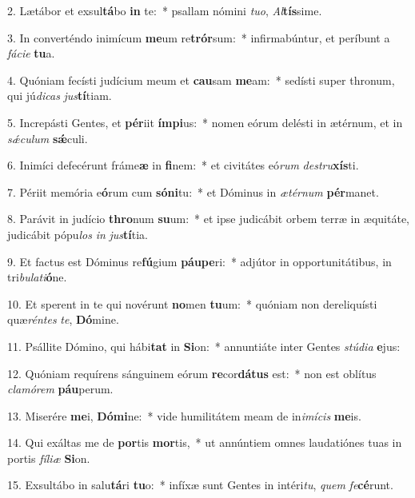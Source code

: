 2. Lætábor et exsul\textbf{tá}bo \textbf{in} te:~*  psallam nómini \textit{tu}\textit{o}, \textit{Al}\textbf{tís}sime.\

3. In converténdo inimícum \textbf{me}um re\textbf{trór}sum:~*  infirmabúntur, et períbunt a \textit{fá}\textit{ci}\textit{e} \textbf{tu}a.\

4. Quóniam fecísti judícium meum et \textbf{cau}sam \textbf{me}am:~*  sedísti super thronum, qui jú\textit{di}\textit{cas} \textit{jus}\textbf{tí}tiam.\

5. Increpásti Gentes, et \textbf{pér}iit \textbf{ím}\textbf{pi}us:~*  nomen eórum delésti in ætérnum, et in \textit{sǽ}\textit{cu}\textit{lum} \textbf{sǽ}culi.\

6. Inimíci defecérunt fráme\textbf{æ} in \textbf{fi}nem:~*  et civitátes eó\textit{rum} \textit{de}\textit{stru}\textbf{xís}ti.\

7. Périit memória e\textbf{ó}rum cum \textbf{só}\textbf{ni}tu:~*  et Dóminus in \textit{æ}\textit{tér}\textit{num} \textbf{pér}manet.\

8. Parávit in judício \textbf{thro}num \textbf{su}um:~*  et ipse judicábit orbem terræ in æquitáte, judicábit pópu\textit{los} \textit{in} \textit{jus}\textbf{tí}tia.\

9. Et factus est Dóminus re\textbf{fú}gium \textbf{páu}\textbf{pe}ri:~*  adjútor in opportunitátibus, in tri\textit{bu}\textit{la}\textit{ti}\textbf{ó}ne.\

10. Et sperent in te qui novérunt \textbf{no}men \textbf{tu}um:~*  quóniam non dereliquísti quæ\textit{rén}\textit{tes} \textit{te}, \textbf{Dó}mine.\

11. Psállite Dómino, qui hábi\textbf{tat} in \textbf{Si}on:~*  annuntiáte inter Gentes \textit{stú}\textit{di}\textit{a} \textbf{e}jus:\

12. Quóniam requírens sánguinem eórum \textbf{re}cor\textbf{dá}\textbf{tus} est:~*  non est oblítus \textit{cla}\textit{mó}\textit{rem} \textbf{páu}perum.\

13. Miserére \textbf{me}i, \textbf{Dó}\textbf{mi}ne:~*  vide humilitátem meam de in\textit{i}\textit{mí}\textit{cis} \textbf{me}is.\

14. Qui exáltas me de \textbf{por}tis \textbf{mor}tis,~*  ut annúntiem omnes laudatiónes tuas in portis \textit{fí}\textit{li}\textit{æ} \textbf{Si}on.\

15. Exsultábo in salu\textbf{tá}ri \textbf{tu}o:~*  infíxæ sunt Gentes in intéri\textit{tu}, \textit{quem} \textit{fe}\textbf{cé}runt.\

